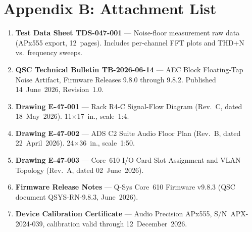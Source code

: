 \section*{Appendix B: Attachment List}

\vspace{4pt}

\begin{enumerate}[leftmargin=*, label=\textbf{ATT-\arabic*:}, itemsep=4pt]
  \item \textbf{Test Data Sheet TDS-047-001} --- Noise-floor measurement raw
        data (APx555 export, 12~pages). Includes per-channel FFT plots and
        THD+N vs.\ frequency sweeps.

  \item \textbf{QSC Technical Bulletin TB-2026-06-14} --- AEC Block
        Floating-Tap Noise Artifact, Firmware Releases 9.8.0 through 9.8.2.
        Published 14~June~2026, Revision~1.0.

  \item \textbf{Drawing E-47-001} --- Rack R4-C Signal-Flow Diagram
        (Rev.\ C, dated 18~May~2026). 11$\times$17~in., scale~1:4.

  \item \textbf{Drawing E-47-002} --- ADS C2 Suite Audio Floor Plan
        (Rev.\ B, dated 22~April~2026). 24$\times$36~in., scale~1:50.

  \item \textbf{Drawing E-47-003} --- Core~610 I/O Card Slot Assignment
        and VLAN Topology (Rev.\ A, dated 02~June~2026).

  \item \textbf{Firmware Release Notes} --- Q-Sys Core~610 Firmware
        v9.8.3 (QSC document QSYS-RN-9.8.3, June~2026).

  \item \textbf{Device Calibration Certificate} --- Audio Precision APx555,
        S/N~APX-2024-039, calibration valid through 12~December~2026.

\end{enumerate}
